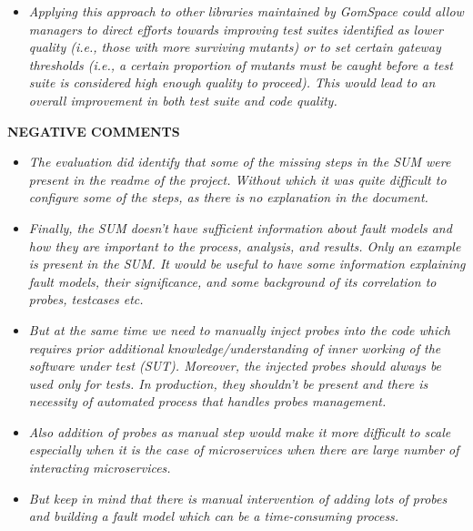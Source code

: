 \begin{itemize}
 

\item \emph{Applying this approach to other libraries maintained by GomSpace could allow managers to direct efforts towards improving test suites identified as lower quality (i.e., those with more surviving mutants) or to set certain gateway thresholds (i.e., a certain proportion of mutants must be caught before a test suite is considered high enough quality to proceed). This would lead to an overall improvement in both test suite and code quality.} 

 \end{itemize}

 
\textbf{NEGATIVE COMMENTS} 
 
\begin{itemize}
\item \emph{The evaluation did identify that some of the missing steps in the SUM were present in the readme of the project. Without which it was quite difficult to configure some of the steps, as there is no explanation in the document.} 

 

\item \emph{Finally, the SUM doesn’t have sufficient information about fault models and how they are important to the process, analysis, and results. Only an example is present in the SUM. It would be useful to have some information explaining fault models, their significance, and some background of its correlation to probes, testcases etc.} 

 

\item \emph{But at the same time we need to manually inject probes into the code which requires prior additional knowledge/understanding of inner working of the software under test (SUT). Moreover, the injected probes should always be used only for tests. In production, they shouldn’t be present and there is necessity of automated process that handles probes management.} 

 

\item \emph{Also addition of probes as manual step would make it more difficult to scale especially when it is the case of microservices when there are large number of interacting microservices.}  

 

\item \emph{But keep in mind that there is manual intervention of adding lots of probes and building a fault model which can be a time-consuming process.} 
\end{itemize}
  
